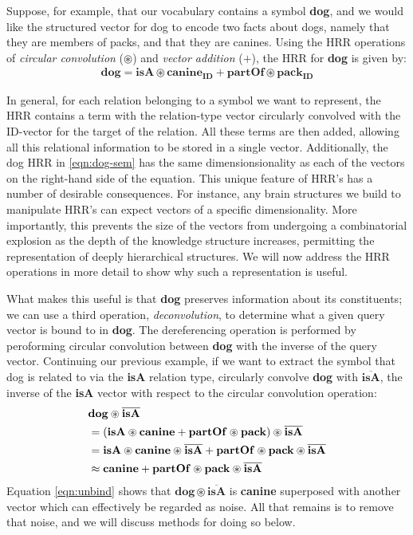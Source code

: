 \documentclass[10pt,letterpaper]{article}
\begin{document}
Suppose, for example, that our vocabulary contains a symbol \textbf{dog}, and we would like the structured vector for dog to encode two facts about dogs, namely that they are members of packs, and that they are canines. Using the HRR operations of \textit{circular convolution} ($\circledast$) and \textit{vector addition} ($+$), the HRR for \textbf{dog} is given by:
\begin{align}
  \mathbf{dog} = \mathbf{isA} \circledast \mathbf{canine_{ID}} + \mathbf{partOf} \circledast \mathbf{pack_{ID}}\label{eqn:dog-sem}
\end{align}

In general, for each relation belonging to a symbol we want to represent, the HRR contains a term with the relation-type vector circularly convolved with the ID-vector for the target of the relation. All these terms are then added, allowing all this relational information to be stored in a single vector. Additionally, the dog HRR in \eqref{eqn:dog-sem} has the same dimensionsionality as each of the vectors on the right-hand side of the equation. This unique feature of HRR's has a number of desirable consequences. For instance, any brain structures we build to manipulate HRR's can expect vectors of a specific dimensionality. More importantly, this prevents the size of the vectors from undergoing a combinatorial explosion as the depth of the knowledge structure increases, permitting the representation of deeply hierarchical structures. We will now address the HRR operations in more detail to show why such a representation is useful.

What makes this useful is that \textbf{dog} preserves information about its constituents; we can use a third operation, \textit{deconvolution}, to determine what a given query vector is bound to in \textbf{dog}. The dereferencing operation is performed by peroforming circular convolution between \textbf{dog} with the inverse of the query vector. Continuing our previous example, if we want to extract the symbol that dog is related to via the \textbf{isA} relation type, circularly convolve \textbf{dog} with $\overline{\mathbf{isA}}$, the inverse of the \textbf{isA} vector with respect to the circular convolution operation:
\begin{align}
&\mathbf{dog} \circledast \overline{\mathbf{isA} }\notag\\
&=(\mathbf{isA} \circledast \mathbf{canine} + \mathbf{partOf} \circledast \mathbf{pack}) \circledast \overline{\mathbf{isA} }\notag\\
&=\mathbf{isA} \circledast \mathbf{canine} \circledast \overline{\mathbf{isA} } + \mathbf{partOf} \circledast \mathbf{pack} \circledast \overline{\mathbf{isA} }\notag\\
&\approx \mathbf{canine} + \mathbf{partOf} \circledast \mathbf{pack} \circledast \overline{\mathbf{isA} }\label{eqn:unbind}
\end{align}
Equation \eqref{eqn:unbind} shows that $\mathbf{dog \circledast \overline{isA}}$ is \textbf{canine} superposed with another vector which can effectively be regarded as noise. All that remains is to remove that noise, and we will discuss methods for doing so below.
 
\end{document}
